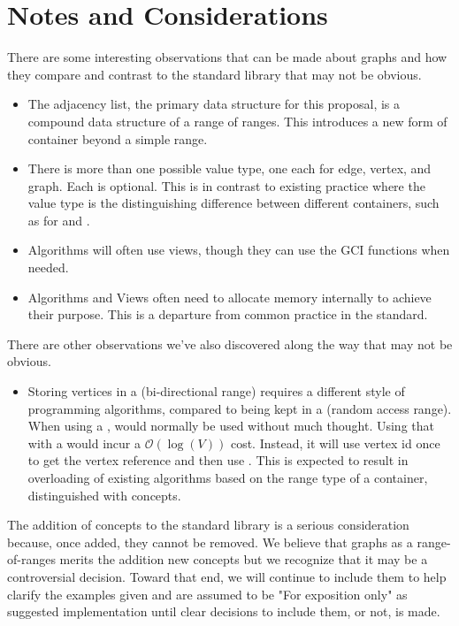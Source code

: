 \section{Notes and Considerations}
There are some interesting observations that can be made about graphs and how they compare and contrast to the 
standard library that may not be obvious.
\begin{itemize}
      \item The adjacency list, the primary data structure for this proposal, is a compound data structure of a
            range of ranges. This introduces a new form of container beyond a simple range.
      \item There is more than one possible value type, one each for edge, vertex, and graph. Each is optional.
            This is in contrast to existing practice where the value type is the distinguishing difference between
            different containers, such as for  and .
      \item Algorithms will often use views, though they can use the GCI functions when needed.
      \item Algorithms and Views often need to allocate memory internally to achieve their purpose. This is a departure from
            common practice in the standard.
\end{itemize}

There are other observations we've also discovered along the way that may not be obvious.
\begin{itemize}
      \item Storing vertices in a  (bi-directional range) requires a different style of programming 
            algorithms, compared to being kept in a  (random access range). When using a ,
             would normally be used without much thought. Using that with a  would
            incur a $\mathcal{O}(\log(V))$ cost. Instead, it will use vertex id once to get the vertex reference 
            and then use . This is expected to result in overloading of existing algorithms based on the
            range type of a container, distinguished with concepts.
\end{itemize}

The addition of concepts to the standard library is a serious consideration because, once added, they cannot 
be removed. We believe that graphs as a range-of-ranges merits the addition new concepts but we recognize that it
may be a controversial decision. Toward that end, we will continue to include them to help clarify the examples given
and are assumed to be "For exposition only" as suggested implementation until clear decisions to include them, or not, 
is made.

